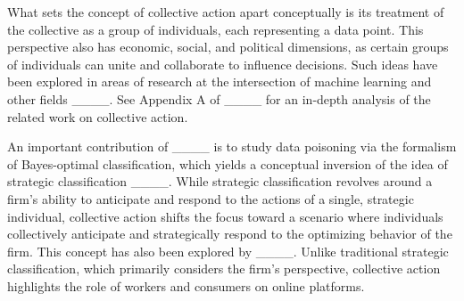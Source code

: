 What sets the concept of collective action apart conceptually is its treatment of the collective as a group of individuals, each representing a data point. This perspective also has economic, social, and political dimensions, as certain groups of individuals can unite and collaborate to influence decisions. Such ideas have been explored in areas of research at the intersection of machine learning and other fields ____. See Appendix A of ____ for an in-depth analysis of the related work on collective action.

An important contribution of ____ is to study data poisoning via the formalism of Bayes-optimal classification, which yields a conceptual inversion of the idea of strategic classification ____. While strategic classification revolves around a firm's ability to anticipate and respond to the actions of a single, strategic individual, collective action shifts the focus toward a scenario where individuals collectively anticipate and strategically respond to the optimizing behavior of the firm. This concept has also been explored by ____. Unlike traditional strategic classification, which primarily considers the firm’s perspective, collective action highlights the role of workers and consumers on online platforms.